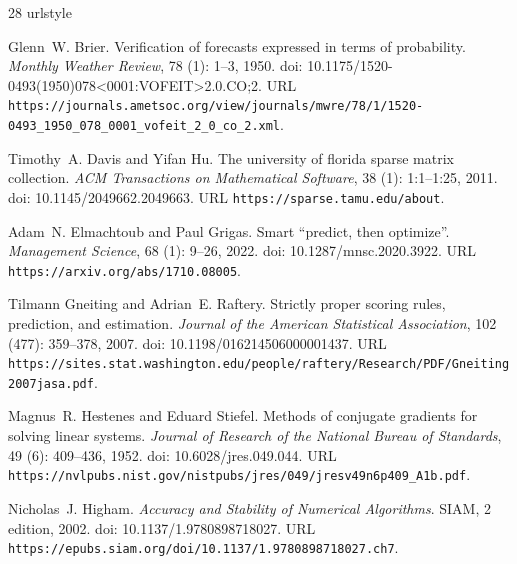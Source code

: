 \documentclass[11pt,a4paper]{article}
\begin{document}
\begin{thebibliography}{28}
\providecommand{\natexlab}[1]{#1}
\providecommand{\url}[1]{\texttt{#1}}
\expandafter\ifx\csname urlstyle\endcsname\relax
  \providecommand{\doi}[1]{doi: #1}\else
  \providecommand{\doi}{doi: \begingroup \urlstyle{rm}\Url}\fi

Glenn~W. Brier.
\newblock Verification of forecasts expressed in terms of probability.
\newblock \emph{Monthly Weather Review}, 78 (1): 1--3, 1950.
\newblock \doi{10.1175/1520-0493(1950)078<0001:VOFEIT>2.0.CO;2}.
\newblock URL
  \url{https://journals.ametsoc.org/view/journals/mwre/78/1/1520-0493_1950_078_0001_vofeit_2_0_co_2.xml}.

Timothy~A. Davis and Yifan Hu.
\newblock The university of florida sparse matrix collection.
\newblock \emph{ACM Transactions on Mathematical Software}, 38
  (1): 1:1--1:25, 2011.
\newblock \doi{10.1145/2049662.2049663}.
\newblock URL \url{https://sparse.tamu.edu/about}.

Adam~N. Elmachtoub and Paul Grigas.
\newblock Smart ``predict, then optimize''.
\newblock \emph{Management Science}, 68 (1): 9--26, 2022.
\newblock \doi{10.1287/mnsc.2020.3922}.
\newblock URL \url{https://arxiv.org/abs/1710.08005}.

Tilmann Gneiting and Adrian~E. Raftery.
\newblock Strictly proper scoring rules, prediction, and estimation.
\newblock \emph{Journal of the American Statistical Association}, 102
  (477): 359--378, 2007.
\newblock \doi{10.1198/016214506000001437}.
\newblock URL
  \url{https://sites.stat.washington.edu/people/raftery/Research/PDF/Gneiting2007jasa.pdf}.

Magnus~R. Hestenes and Eduard Stiefel.
\newblock Methods of conjugate gradients for solving linear systems.
\newblock \emph{Journal of Research of the National Bureau of Standards},
  49 (6): 409--436, 1952.
\newblock \doi{10.6028/jres.049.044}.
\newblock URL
  \url{https://nvlpubs.nist.gov/nistpubs/jres/049/jresv49n6p409_A1b.pdf}.

Nicholas~J. Higham.
\newblock \emph{Accuracy and Stability of Numerical Algorithms}.
\newblock SIAM, 2 edition, 2002.
\newblock \doi{10.1137/1.9780898718027}.
\newblock URL \url{https://epubs.siam.org/doi/10.1137/1.9780898718027.ch7}.


\end{thebibliography}
\end{document}
